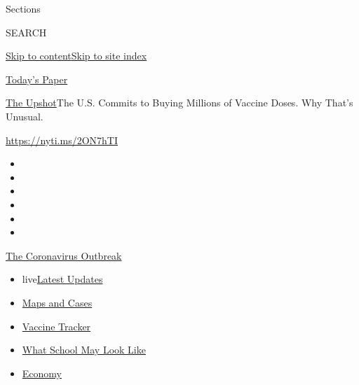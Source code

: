 Sections

SEARCH

\protect\hyperlink{site-content}{Skip to
content}\protect\hyperlink{site-index}{Skip to site index}

\href{https://myaccount.nytimes3xbfgragh.onion/auth/login?response_type=cookie\&client_id=vi}{}

\href{https://www.nytimes3xbfgragh.onion/section/todayspaper}{Today's
Paper}

\href{/section/upshot}{The Upshot}\textbar{}The U.S. Commits to Buying
Millions of Vaccine Doses. Why That's Unusual.

\url{https://nyti.ms/2ON7hTI}

\begin{itemize}
\item
\item
\item
\item
\item
\item
\end{itemize}

\href{https://www.nytimes3xbfgragh.onion/news-event/coronavirus?action=click\&pgtype=Article\&state=default\&region=TOP_BANNER\&context=storylines_menu}{The
Coronavirus Outbreak}

\begin{itemize}
\tightlist
\item
  live\href{https://www.nytimes3xbfgragh.onion/2020/08/01/world/coronavirus-covid-19.html?action=click\&pgtype=Article\&state=default\&region=TOP_BANNER\&context=storylines_menu}{Latest
  Updates}
\item
  \href{https://www.nytimes3xbfgragh.onion/interactive/2020/us/coronavirus-us-cases.html?action=click\&pgtype=Article\&state=default\&region=TOP_BANNER\&context=storylines_menu}{Maps
  and Cases}
\item
  \href{https://www.nytimes3xbfgragh.onion/interactive/2020/science/coronavirus-vaccine-tracker.html?action=click\&pgtype=Article\&state=default\&region=TOP_BANNER\&context=storylines_menu}{Vaccine
  Tracker}
\item
  \href{https://www.nytimes3xbfgragh.onion/interactive/2020/07/29/us/schools-reopening-coronavirus.html?action=click\&pgtype=Article\&state=default\&region=TOP_BANNER\&context=storylines_menu}{What
  School May Look Like}
\item
  \href{https://www.nytimes3xbfgragh.onion/live/2020/07/31/business/stock-market-today-coronavirus?action=click\&pgtype=Article\&state=default\&region=TOP_BANNER\&context=storylines_menu}{Economy}
\end{itemize}

